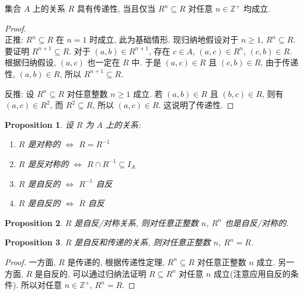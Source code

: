 \documentclass[UTF8]{ctexart}
\theoremstyle{mystyle}
\newtheorem{proposition}{Proposition}[section]
\theoremstyle{myremark}
\theoremstyle{plain}
\newcommand{\Z}{\mathbb Z}
\begin{document}
\begin{theorem}
    集合 $ A $ 上的关系 $ R $ 具有传递性, 当且仅当 $ R^n \subseteq R $ 对任意 $ n \in \Z^+ $ 均成立.
\end{theorem}

\begin{proof} \ \\
    正推: $ R^n \subseteq R $ 在 $ n = 1 $ 时成立, 此为基础情形. 现归纳地假设对于 $ n \geqslant 1 $, $ R^n \subseteq R $. 要证明 $ R^{n + 1} \subseteq R $. 对于 $ (a, b) \in R^{n + 1} $, 存在 $ c \in A $, $ (a, c) \in R^n $, $ (c, b) \in R $. 根据归纳假设, $ (a, c) $ 也一定在 $ R $ 中. 于是 $ (a, c) \in R $ 且 $ (c, b) \in R $, 由于传递性, $ (a, b) \in R $, 所以 $ R^{n + 1} \subseteq R $.
    
    反推: 设 $ R^n \subseteq R $ 对任意整数 $ n \geqslant 1 $ 成立. 若 $ (a, b) \in R $ 且 $ (b, c) \in R $, 则有 $ (a, c) \in R^2 $, 而 $ R^2 \subseteq R $, 所以 $ (a, c) \in R $. 这说明了传递性.
\end{proof}


\begin{proposition}
    设 $ R $ 为 $ A $ 上的关系:
    \begin{enumerate}
        \item $ R $ 是对称的 $ \iff $ $ R = R^{-1} $
        \item $ R $ 是反对称的 $ \iff $ $ R \cap R^{-1} \subseteq I_A $
        \item $ R $ 是自反的 $ \iff $ $ R^{-1} $ 自反
        \item $ R $ 是自反的 $ \iff $ $ \overline R $ 自反
    \end{enumerate}
\end{proposition}

\begin{proposition}
    $ R $ 是自反/对称关系, 则对任意正整数 $ n $, $ R^n $ 也是自反/对称的.
\end{proposition}

\begin{proposition}
    $ R $ 是自反和传递的关系, 则对任意正整数 $ n $, $ R^n = R $.
\end{proposition}

\begin{proof}
    一方面, $ R $ 是传递的, 根据传递性定理, $ R^n \subseteq R $ 对任意正整数 $ n $ 成立. 另一方面, $ R $ 是自反的, 可以通过归纳法证明 $ R \subseteq R^n $ 对任意 $ n $ 成立(注意应用自反的条件). 所以对任意 $ n \in \Z^+ $, $ R^n = R $.
\end{proof}
\end{document}
